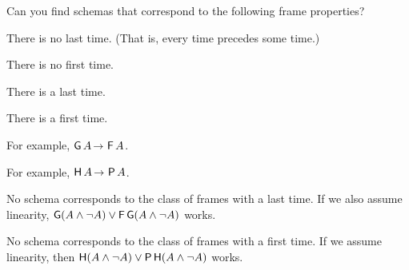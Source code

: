 

\begin{exercise}
  Can you find schemas that correspond to the following frame properties?
  \begin{exlist}
  \item There is no last time. (That is, every time precedes some time.)
  \item There is no first time. 
  \item There is a last time.
  \item There is a first time.
  \end{exlist}
\end{exercise}
\begin{solution}
  \begin{sollist}
    \item For example, $\tG A \to \tF A$.
  \item For example, $\tH A \to \tP A$.
  \item No schema corresponds to the class of frames with a last time. If we
  also assume linearity,  $\operatorname{\mathsf{G}}(A \land \neg A) \lor \operatorname{\mathsf{F}}\operatorname{\mathsf{G}}(A \land \neg A)$ works.
  \item No schema corresponds to the class of frames with a first time. If we
    assume linearity, then
    $\operatorname{\mathsf{H}}(A \land \neg A) \lor \operatorname{\mathsf{P}}\operatorname{\mathsf{H}}(A \land \neg A)$ works.
  \end{sollist}
\end{solution}
\vspace{-2mm}

